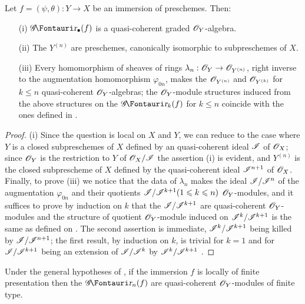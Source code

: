 \begin{proposition}[16.1.5]
\label{IV.16.1.5}
Let $f = (\psi, \theta): Y \to X$ be an immersion of preschemes.
Then:
\begin{enumerate}
  \item[{\rm(i)}] $\shGr_\bullet(f)$ is a quasi-coherent graded $\mathscr{O}_Y$-algebra.
  \item[{\rm(ii)}] The $Y^{(n)}$ are preschemes, canonically isomorphic to subpreschemes of $X$.
  \item[{\rm(iii)}] Every homomorphism of sheaves of rings $\lambda_n: \sh{O}_Y \to \sh{O}_{Y^{(n)}}$, right inverse to the augmentation homomorphism $\varphi_{0n}$, makes the $\mathscr{O}_{Y^{(n)}}$ and $\mathscr{O}_{Y^{(k)}}$ for $k\leq n$ quasi-coherent $\mathscr{O}_Y$-algebras;
  the $\mathscr{O}_Y$-module structures induced from the above structures on the $\shGr_k(f)$ for $k \leq n$ coincide with the ones defined in .
\end{enumerate}
\end{proposition}

\begin{proof}
(i) Since the question is local on $X$ and $Y$, we can reduce to the case where $Y$ is a closed subpreschemes of $X$ defined by an quasi-coherent ideal $\mathscr{I}$ of $\mathscr{O}_X$;
since $\mathscr{O}_Y$ is the restriction to $Y$ of $\mathscr{O}_X/\mathscr{I}$ the assertion (i) is evident, and $Y^{(n)}$ is the closed subprescheme of $X$ defined by the quasi-coherent ideal $\mathscr{I}^{n+1}$ of $\mathscr{O}_X$.
Finally, to prove (iii) we notice that the data of $\lambda_n$ makes the ideal $\mathscr{I}/\mathscr{I}^n$ of the augmentation $\varphi_{0n}$ and their quotients $\mathscr{I}/\mathscr{I}^{k+1} (1\leqslant k \leqslant n)$ $\mathscr{O}_Y$-modules, and it suffices to prove by induction on $k$ that the $\mathscr{I}/\mathscr{I}^{k+1}$ are quasi-coherent $\mathscr{O}_Y$-modules and the structure of quotient $\mathscr{O}_Y$-module induced on $\mathscr{I}^k/\mathscr{I}^{k+1}$ is the same as defined on .
The second assertion is immediate, $\mathscr{I}^k/\mathscr{I}^{k+1}$ being killed by $\mathscr{I}/\mathscr{I}^{n+1}$;
the first result, by induction on $k$, is trivial for $k=1$ and for $\mathscr{I}/\mathscr{I}^{k+1}$ being an extension of $\mathscr{I}/\mathscr{I}^{k}$ by $\mathscr{I}^k/\mathscr{I}^{k+1}$ .
\end{proof}

\begin{corollary}[16.1.6]
\label{IV.16.1.6}
Under the general hypotheses of , if the immersion $f$ is locally of finite presentation then the $\shGr_n(f)$ are quasi-coherent $\mathscr{O}_Y$-modules of finite type.
\end{corollary}

